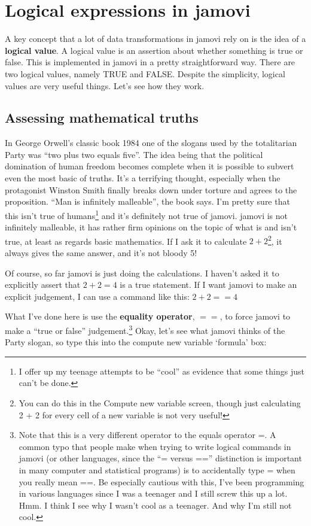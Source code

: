 \documentclass[
]{book}
\begin{document}
\hypertarget{logical-expressions-in-jamovi}{%
\section{Logical expressions in jamovi}\label{logical-expressions-in-jamovi}}

A key concept that a lot of data transformations in jamovi rely on is the idea of a \textbf{logical value}. A logical value is an assertion about whether something is true or false. This is implemented in jamovi in a pretty straightforward way. There are two logical values, namely TRUE and FALSE. Despite the simplicity, logical values are very useful things. Let's see how they work.

\hypertarget{assessing-mathematical-truths}{%
\subsection{Assessing mathematical truths}\label{assessing-mathematical-truths}}

In George Orwell's classic book 1984 one of the slogans used by the totalitarian Party was ``two plus two equals five''. The idea being that the political domination of human freedom becomes complete when it is possible to subvert even the most basic of truths. It's a terrifying thought, especially when the protagonist Winston Smith finally breaks down under torture and agrees to the proposition. ``Man is infinitely malleable'', the book says. I'm pretty sure that this isn't true of humans\footnote{I offer up my teenage attempts to be ``cool'' as evidence that some things just can't be done.} and it's definitely not true of jamovi. jamovi is not infinitely malleable, it has rather firm opinions on the topic of what is and isn't true, at least as regards basic mathematics. If I ask it to calculate \(2 + 2\)\footnote{You can do this in the Compute new variable screen, though just calculating 2 + 2 for every cell of a new variable is not very useful!}, it always gives the same answer, and it's not bloody 5!

Of course, so far jamovi is just doing the calculations. I haven't asked it to explicitly assert that \(2 + 2 = 4\) is a true statement. If I want jamovi to make an explicit judgement, I can use a command like this: \(2 + 2 == 4\)

What I've done here is use the \textbf{equality operator}, \(==\), to force jamovi to make a ``true or false'' judgement.\footnote{Note that this is a very different operator to the equals operator =. A common typo that people make when trying to write logical commands in jamovi (or other languages, since the ``= versus =='' distinction is important in many computer and statistical programs) is to accidentally type = when you really mean ==. Be especially cautious with this, I've been programming in various languages since I was a teenager and I still screw this up a lot. Hmm. I think I see why I wasn't cool as a teenager. And why I'm still not cool.} Okay, let's see what jamovi thinks of the Party slogan, so type this into the compute new variable `formula' box:
\end{document}
